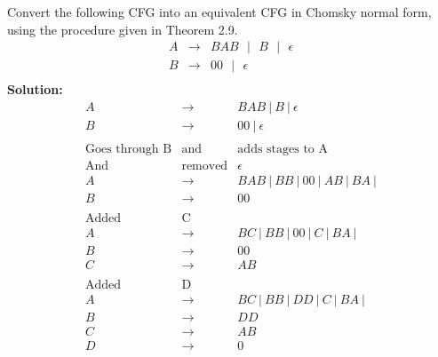 \documentclass[12pt]{article}
\begin{document}
Convert the following CFG into an equivalent CFG in Chomsky normal form, using the procedure given in Theorem 2.9.
\begin{eqnarray} \nonumber
A &\to & BAB \textrm{ } | \textrm{ } B \textrm{ } | \textrm{ } \epsilon \\ \nonumber
B &\to & 00 \textrm{ } | \textrm{ } \epsilon \\  \nonumber
\end{eqnarray}
\textbf{Solution:} \\
\begin{eqnarray} \nonumber
A &\to & BAB \ | \ B \ | \ \epsilon \\ \nonumber
B &\to & 00 \ | \ \epsilon \\  \nonumber
\\ \nonumber
\textrm{Goes through B} & \textrm{and} & \textrm{adds stages to A }\\  \nonumber
\textrm{And } & \textrm{removed} & \epsilon \\ \nonumber
A &\to & BAB \ | \ BB \ | \ 00 \ | \ AB \ | \ BA \ | \\ \nonumber
B &\to & 00  \\  \nonumber
\\ \nonumber
\textrm{Added } & \textrm{C} & \\  \nonumber
A &\to & BC \ | \ BB \ | \ 00 \ | \ C \ | \ BA \ | \\ \nonumber
B &\to & 00  \\  \nonumber
C &\to & AB  \\  \nonumber
\\ \nonumber
\textrm{Added } & \textrm{D} & \\  \nonumber
A &\to & BC \ | \ BB \ | \ DD \ | \ C \ | \ BA \ | \\ \nonumber
B &\to & DD  \\  \nonumber
C &\to & AB  \\  \nonumber
D &\to & 0  \\  \nonumber
\\ \nonumber
\end{eqnarray}
\end{document}
